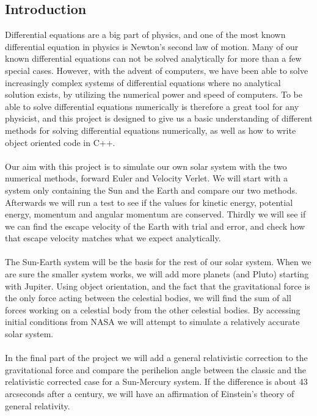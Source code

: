 \documentclass{article}
\begin{document}
\subsection{Introduction}
Differential equations are a big part of physics, and one of the most known differential equation in physics is Newton's second law of motion. Many of our known differential equations can not be solved analytically for more than a few special cases. However, with the advent of computers, we have been able to solve increasingly complex systems of differential equations where no analytical solution exists, by utilizing the numerical power and speed of computers. To be able to solve differential equations numerically is therefore a great tool for any physicist, and this project is designed to give us a basic understanding of different methods for solving differential equations numerically, as well as how to write object oriented code in C++. \\ \\
Our aim with this project is to simulate our own solar system with the two numerical methods, forward Euler and Velocity Verlet. We will start with a system only containing the Sun and the Earth and compare our two methods. Afterwards we will run a test to see if the values for kinetic energy, potential energy, momentum and angular momentum are conserved. Thirdly we will see if we can find the escape velocity of the Earth with trial and error, and check how that escape velocity matches what we expect analytically. \\\\
The Sun-Earth system will be the basis for the rest of our solar system. When we are sure the smaller system works, we will add more planets (and Pluto) starting with Jupiter. Using object orientation, and the fact that the gravitational force is the only force acting between the celestial bodies, we will find the sum of all forces working on a celestial body from the other celestial bodies. By accessing initial conditions from NASA \cite{nasa} we will attempt to simulate a relatively accurate solar system. \\\\
In the final part of the project we will add a general relativistic correction to the gravitational force and compare the perihelion angle between the classic and the relativistic corrected case for a Sun-Mercury system. %
If the difference is about 43 arcseconds after a century, we will have an affirmation of Einstein's theory of general relativity.
\end{document}
